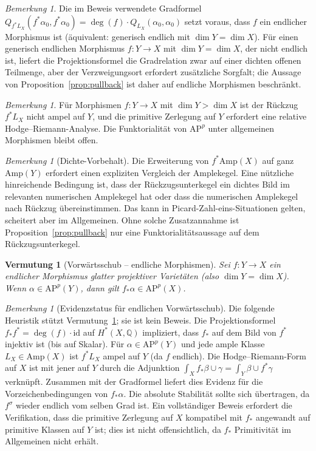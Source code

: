 \documentclass[aps,prd,twocolumn,superscriptaddress,nofootinbib]{revtex4-2}
\newtheorem{conjecture}[theorem]{Vermutung}
\theoremstyle{definition}
\theoremstyle{remark}
\newtheorem{remark}[theorem]{Bemerkung}
\begin{document}
\begin{remark}
Die im Beweis verwendete Gradformel $Q_{f^*L_X}(f^*\alpha_0, f^*\alpha_0) = \deg(f) \cdot Q_{L_X}(\alpha_0, \alpha_0)$ setzt voraus, dass $f$ ein endlicher Morphismus ist (äquivalent: generisch endlich mit $\dim Y = \dim X$). Für einen generisch endlichen Morphismus $f: Y \to X$ mit $\dim Y = \dim X$, der nicht endlich ist, liefert die Projektionsformel die Gradrelation zwar auf einer dichten offenen Teilmenge, aber der Verzweigungsort erfordert zusätzliche Sorgfalt; die Aussage von Proposition~\ref{prop:pullback} ist daher auf endliche Morphismen beschränkt.
\end{remark}

\begin{remark}
Für Morphismen $f: Y \to X$ mit $\dim Y > \dim X$ ist der Rückzug $f^*L_X$ nicht ampel auf $Y$, und die primitive Zerlegung auf $Y$ erfordert eine relative Hodge--Riemann-Analyse. Die Funktorialität von $\mathrm{AP}^p$ unter allgemeinen Morphismen bleibt offen.
\end{remark}

\begin{remark}[Dichte-Vorbehalt]\label{rem:density-caveat}
Die Erweiterung von $f^*\mathrm{Amp}(X)$ auf ganz $\mathrm{Amp}(Y)$ erfordert einen expliziten Vergleich der Amplekegel. Eine nützliche hinreichende Bedingung ist, dass der Rückzugsunterkegel ein dichtes Bild im relevanten numerischen Amplekegel hat oder dass die numerischen Amplekegel nach Rückzug übereinstimmen. Das kann in Picard-Zahl-eins-Situationen gelten, scheitert aber im Allgemeinen. Ohne solche Zusatzannahme ist Proposition~\ref{prop:pullback} nur eine Funktorialitätsaussage auf dem Rückzugsunterkegel.
\end{remark}

\begin{conjecture}[Vorwärtsschub -- endliche Morphismen]
\label{prop:pushforward}
Sei $f: Y \to X$ ein endlicher Morphismus glatter projektiver Varietäten (also $\dim Y = \dim X$). Wenn $\alpha \in \mathrm{AP}^{p}(Y)$, dann gilt $f_*\alpha \in \mathrm{AP}^p(X)$.
\end{conjecture}

\begin{remark}[Evidenzstatus für endlichen Vorwärtsschub]
Die folgende Heuristik stützt Vermutung~\ref{prop:pushforward}; sie ist kein
Beweis. Die Projektionsformel $f_*f^* = \deg(f) \cdot \mathrm{id}$ auf
$H^*(X, \mathbb{Q})$ impliziert, dass $f_*$ auf dem Bild von $f^*$ injektiv ist
(bis auf Skalar). Für $\alpha \in \mathrm{AP}^p(Y)$ und jede ample Klasse
$L_X \in \mathrm{Amp}(X)$ ist $f^*L_X$ ampel auf $Y$ (da $f$ endlich). Die
Hodge--Riemann-Form auf $X$ ist mit jener auf $Y$ durch die Adjunktion
$\int_X f_*\beta \cup \gamma = \int_Y \beta \cup f^*\gamma$ verknüpft.
Zusammen mit der Gradformel liefert dies Evidenz für die Vorzeichenbedingungen
von $f_*\alpha$. Die absolute Stabilität sollte sich übertragen, da $f^\sigma$
wieder endlich vom selben Grad ist. Ein vollständiger Beweis erfordert die
Verifikation, dass die primitive Zerlegung auf $X$ kompatibel mit $f_*$
angewandt auf primitive Klassen auf $Y$ ist; dies ist nicht offensichtlich, da
$f_*$ Primitivität im Allgemeinen nicht erhält.
\end{remark}
\end{document}
